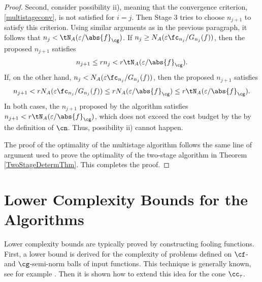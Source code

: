 \documentclass[]{elsarticle}
\theoremstyle{definition}
\theoremstyle{remark}
\newcommand{\Gnorm}[1]{\abs{#1}_{\cg}}
\begin{document}
\begin{proof}
Second, consider possibility ii), meaning that the convergence criterion, \eqref{multistageconv}, is not satisfied for $i=j$.  Then Stage 3 tries to choose $n_{j+1}$ to satisfy this criterion.  Using similar arguments as in the previous paragraph, it follows that $n_j < \tN_A(\varepsilon/\Gnorm{f})$. 
If $n_j \ge N_{A}(\varepsilon \fc_{n_j}/G_{n_j}(f))$, then the proposed $n_{j+1}$ satisfies
\begin{equation*}
n_{j+1} \le r  n_j < r \tN_{A}(\varepsilon/\Gnorm{f}).
\end{equation*}
If, on the other hand, $n_j < N_{A}(\varepsilon \fc_{n_j}/G_{n_j}(f))$, then the proposed $n_{j+1}$ satisfies
\begin{equation*}
n_{j+1} < r  N_{A}(\varepsilon \fc_{n_j}/G_{n_j}(f)) \le r  N_{A}(\varepsilon/\Gnorm{f}) \le r \tN_{A}(\varepsilon/\Gnorm{f}).
\end{equation*}
In both cases, the $n_{j+1}$ proposed by the algorithm satisfies $n_{j+1} < r \tN_{A}(\varepsilon/\Gnorm{f})$, which does not exceed the cost budget by the  by the definition of $\cn$.  Thus, possibility ii) cannot happen.

The proof of the optimality of the multistage algorithm follows the same line of argument used to prove the optimality of the two-stage algorithm in Theorem \ref{TwoStageDetermThm}.  This completes the proof.
\end{proof}

\section{Lower Complexity Bounds for the Algorithms} \label{LowBoundSec}
Lower complexity bounds are typically proved by constructing fooling functions.  First, a lower bound is derived for the complexity of problems defined on $\cf$- and $\cg$-semi-norm balls of input functions.  This technique is generally known, see for example \cite[p.\ 11--12]{TraWer98}.  Then it is shown how to extend this idea for the cone $\cc_{\tau}$.  
\end{document}
